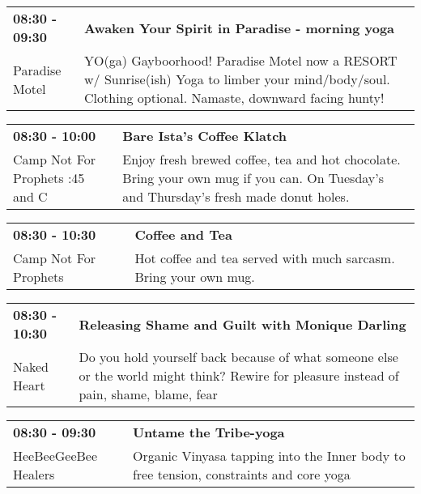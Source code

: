 \begin{tabular}{ p{1in} p{2.2in} }
    \textbf{08:30 - 09:30} & \textbf{Awaken Your Spirit in Paradise - morning yoga} \\
    Paradise Motel \newline  & YO(ga) Gayboorhood! Paradise Motel now a RESORT w/ Sunrise(ish) Yoga to limber your mind/body/soul. Clothing optional. Namaste, downward facing hunty! \\
    \hline 
\end{tabular}
    
\begin{tabular}{ p{1in} p{2.2in} }
    \textbf{08:30 - 10:00} & \textbf{Bare Ista's Coffee Klatch } \\
    Camp Not For Prophets \newline 2:45 and C & Enjoy fresh brewed coffee, tea and hot chocolate. Bring your own mug if you can. On Tuesday's and Thursday's fresh made donut holes. \\
    \hline 
\end{tabular}
    
\begin{tabular}{ p{1in} p{2.2in} }
    \textbf{08:30 - 10:30} & \textbf{Coffee and Tea} \\
    Camp Not For Prophets \newline  & Hot coffee and tea served with much sarcasm.  Bring your own mug. \\
    \hline 
\end{tabular}
    
\begin{tabular}{ p{1in} p{2.2in} }
    \textbf{08:30 - 10:30} & \textbf{Releasing Shame and Guilt with Monique Darling} \\
    Naked Heart \newline  & Do you hold yourself back because of what someone else or the world might think? Rewire for pleasure instead of pain, shame, blame, fear \\
    \hline 
\end{tabular}
    
\begin{tabular}{ p{1in} p{2.2in} }
    \textbf{08:30 - 09:30} & \textbf{Untame the Tribe-yoga} \\
    HeeBeeGeeBee Healers \newline  & Organic Vinyasa tapping into the Inner body to free tension, constraints and core yoga \\
    \hline 
\end{tabular}
    
